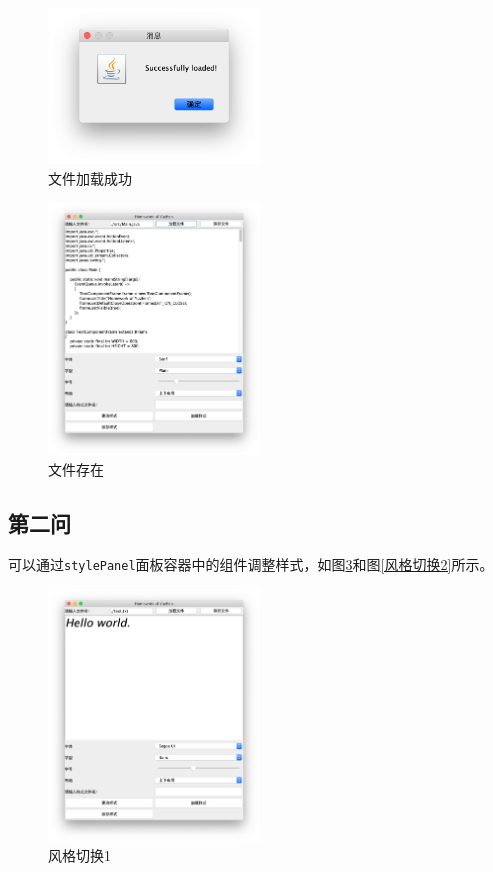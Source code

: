 \documentclass[11pt]{homework}
\begin{document}
  \begin{figure}
    \centering
    \includegraphics[width=0.5\textwidth]{文件加载成功}
    \caption{文件加载成功}
    \label{文件加载成功}
  \end{figure}

  \begin{figure}
    \centering
    \includegraphics[width=0.5\textwidth]{文件存在}
    \caption{文件存在}
    \label{文件存在}
  \end{figure}
  
  \subsection*{第二问}

  可以通过\verb|stylePanel|面板容器中的组件调整样式，如图\ref{风格切换1}和图\ref{风格切换2}所示。

  \begin{figure}
    \centering
    \includegraphics[width=0.5\textwidth]{风格切换1}
    \caption{风格切换1}
    \label{风格切换1}
  \end{figure}
\end{document}
